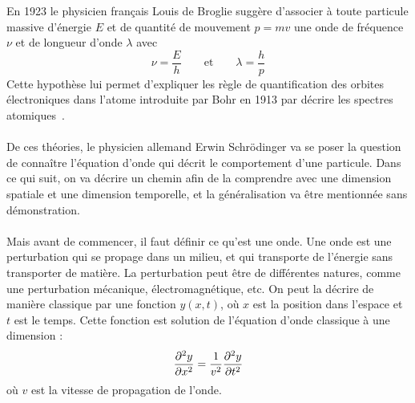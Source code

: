 En 1923 le physicien français Louis de Broglie suggère d’associer à toute particule massive d’énergie $E$ et
de quantité de mouvement $p = mv$ une onde de fréquence $\nu$ et de longueur d’onde $\lambda$ avec
\[
    \nu = \frac{E}{h} \qquad \text{et} \qquad \lambda = \frac{h}{p}
\]
Cette hypothèse lui permet d’expliquer les règle de quantification des orbites électroniques dans l’atome introduite
par Bohr en 1913 par décrire les spectres atomiques~\cite{myst-monde-quantique}.\\ \\
De ces théories, le physicien allemand Erwin Schrödinger va se poser la question de connaître l'équation
d'onde qui décrit le comportement d'une particule.
Dans ce qui suit, on va décrire un chemin afin de la comprendre avec une dimension spatiale et une
dimension temporelle, et la généralisation va être mentionnée sans démonstration.\\ \\
Mais avant de commencer, il faut définir ce qu'est une onde.
Une onde est une perturbation qui se propage dans un milieu, et qui transporte de l'énergie sans
transporter de matière.
La perturbation peut être de différentes natures, comme une perturbation mécanique, électromagnétique,
etc.
On peut la décrire de manière classique par une fonction $y(x,t)$, où $x$ est la position dans l'espace et
$t$ est le temps.
Cette fonction est solution de l'équation d'onde classique à une dimension :
\[
    \pdv[2]{y}{x} = \frac{1}{v^2} \pdv[2]{y}{t}
\]
où $v$ est la vitesse de propagation de l'onde.
